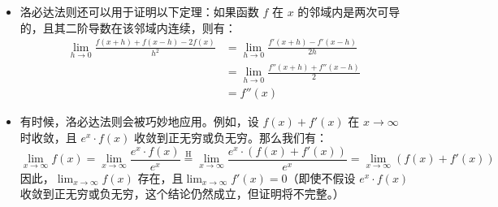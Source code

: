 \begin{itemize}
$$$$
\item 洛必达法则还可以用于证明以下定理：如果函数 $f$ 在 $x$ 的邻域内是两次可导的，且其二阶导数在该邻域内连续，则有：
$$
\begin{aligned}
\lim_{h \to 0} \frac{f(x+h) + f(x-h) - 2f(x)}{h^2}
&= \lim_{h \to 0} \frac{f'(x+h) - f'(x-h)}{2h}\\
&= \lim_{h \to 0} \frac{f''(x+h) + f''(x-h)}{2}\\
&= f''(x)
\end{aligned}~
$$
\item 有时候，洛必达法则会被巧妙地应用。例如，设 $f(x) + f'(x)$ 在 $x \to \infty$ 时收敛，且 $e^x \cdot f(x)$ 收敛到正无穷或负无穷。那么我们有：
$$
\lim_{x \to \infty} f(x)
= \lim_{x \to \infty} \frac{e^x \cdot f(x)}{e^x}
\stackrel{\mathrm{H}}{=}
\lim_{x \to \infty} \frac{e^x \cdot (f(x) + f'(x))}{e^x}
= \lim_{x \to \infty} (f(x) + f'(x))~
$$
因此，$\lim_{x \to \infty} f(x)$ 存在，且$\lim_{x \to \infty} f'(x) = 0$（即使不假设 $e^x \cdot f(x)$ 收敛到正无穷或负无穷，这个结论仍然成立，但证明将不完整。）
\end{itemize}


